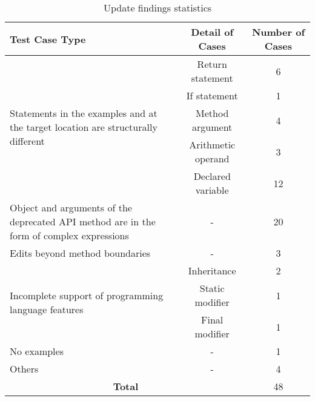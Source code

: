 \begin{table}
\caption{Update findings statistics}
\begin{center}
\begin{tabular}{ | p{8em} |c|c| } 
 \hline
 \textbf{Test Case Type} & \textbf{Detail of Cases} & \textbf{Number of Cases} \\ 
 \hline
 \multirow{5}{8em}{Statements in the examples and at the target location are structurally different} & Return statement & 6 \\\cline{2-3} & If statement & 1 \\\cline{2-3} & Method argument & 4 \\\cline{2-3} & Arithmetic operand & 3 \\\cline{2-3}  & Declared variable & 12 \\\cline{2-3} 
 \hline
  Object and arguments of the deprecated API method are in the form of complex expressions & - & 20\\
 \hline
 Edits beyond method boundaries & - & 3\\
\hline
 \multirow{3}{8em}{Incomplete support of programming language features} & Inheritance & 2\\\cline{2-3} & Static modifier & 1 \\\cline{2-3} & Final modifier & 1\\\cline{2-3}
 \hline
 No examples & - & 1\\
 \hline
 Others & - & 4\\
 \hline
 \multicolumn{2}{|c|}{\bf Total} & 48\\
 \hline
\end{tabular}
\end{center}
\label{table:data_statistic}
\end{table}

